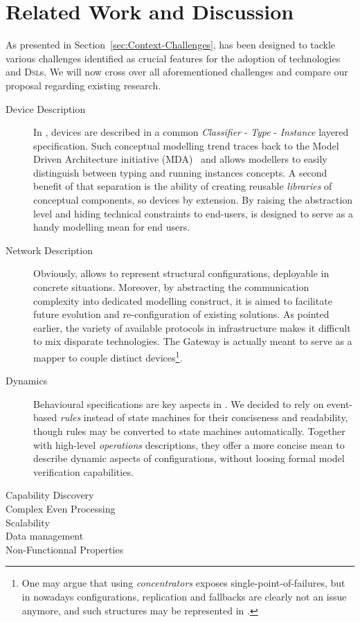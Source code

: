 \section{Related Work and Discussion}
\label{sec:RW}

As presented in Section~\ref{sec:Context-Challenges}, \IOTDSL has been designed to tackle various challenges identified as crucial features for the adoption of \IOT technologies and \textsc{Dsl}s. We will now cross over all aforementioned challenges and compare our proposal regarding existing research.

\begin{description}
  \item[Device Description] In \IOTDSL, devices are described in a common \textit{Classifier} - \textit{Type} - \textit{Instance} layered specification. Such conceptual modelling trend traces back to the Model Driven Architecture initiative (\textsc{MDA})~\cite{omg-mda-01} and allows modellers to easily distinguish between typing and running instances concepts. A second benefit of that separation is the ability of creating reusable \textit{libraries} of conceptual components, so \IOT devices by extension. By raising the abstraction level and hiding technical constraints to end-users, \IOTDSL is designed to serve as a handy modelling mean for end users.
  \item[Network Description] Obviously, \IOTDSL allows to represent structural configurations, deployable in concrete situations. Moreover, by abstracting the communication complexity into dedicated modelling construct, it is aimed to facilitate future evolution and re-configuration of existing solutions. As pointed earlier, the variety of available protocols in \IOT infrastructure makes it difficult to mix disparate technologies. The \textsf{Gateway} is actually meant to serve as a mapper to couple distinct devices\footnote{One may argue that using \textit{concentrators} exposes single-point-of-failures, but in nowadays configurations, replication and fallbacks are clearly not an issue anymore, and such structures may be represented in \IOTDSL.}.
  \item[Dynamics] Behavioural specifications are key aspects in \IOTDSL. We decided to rely on event-based \textit{rules} instead of state machines for their conciseness and readability, though rules may be converted to state machines automatically. Together with high-level \textit{operations} descriptions, they offer a more concise mean to describe dynamic aspects of \IOT configurations, without loosing formal model verification capabilities.
  \item[Capability Discovery]
  \item[Complex Even Processing]
  \item[Scalability]
  \item[Data management]
  \item[Non-Functionnal Properties]
\end{description}

